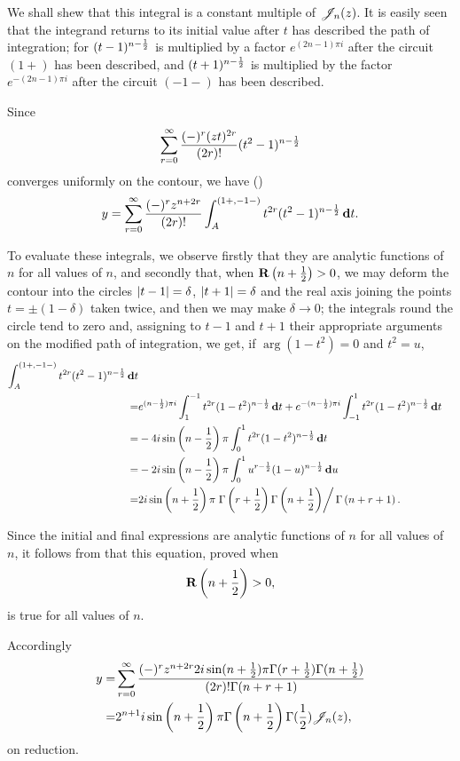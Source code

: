 We shall shew that this integral is a constant multiple of $\mathscr{J}_{n}(z)$.
It is easily seen that the integrand returns to its initial value
after $t$ has described the path of integration; for
$(t-1)^{n-\frac{1}{2}}$ is multiplied by a factor
$e^{(2n-1)\pi i}$ after the circuit $(1+)$ has been described, and
$(t+1)^{n-\frac{1}{2}}$ is multiplied by the factor
$e^{-(2n-1)\pi i}$ after the circuit $(-1-)$ has been described.

Since
$$
\sum_{r=0}^{\infty}
\frac{(-)^{r} (zt)^{2r}}{(2r)!}
(t^{2}-1)^{n-\frac{1}{2}}
$$
converges uniformly on the contour, we have ()
$$
y
=
\sum_{r=0}^{\infty}
\frac{(-)^{r} z^{n+2r}}{(2r)!}
\int_{A}^{(1+,-1-)}
t^{2r}
(t^{2}-1)^{n-\frac{1}{2}}
\, \mathbf{d} t.
$$

To evaluate these integrals, we observe firstly that they are analytic
functions of $n$ for all values of $n$, and secondly that, when
$\operatorname{\mathbf{R}}\left( n+\frac{1}{2} \right) > 0$, we may deform the contour into the
circles $\left| t-1 \right|=\delta$, $\left| t+1 \right|=\delta$ and the real axis
joining the points $t = \pm (1-\delta)$ taken twice, and then we may
make $\delta \rightarrow 0$; the integrals round the circle tend to
zero and, assigning to $t-1$
% 
% 
and $t+1$ their appropriate arguments on the modified path of
integration, we get, if $\arg (1-t^{2}) = 0$ and $t^{2} = u$,
\begin{align*}
  \int_{A}^{(1+,-1-)}
  t^{2r} (t^{2}-1)^{n-\frac{1}{2}} \, \mathbf{d} t
  \\
  =&
  e^{(n-\frac{1}{2}) \pi i}
  \int_{1}^{-1} t^{2r} (1-t^{2})^{n-\frac{1}{2}} \, \mathbf{d} t
  + e^{-(n-\frac{1}{2}) \pi i}
  \int_{-1}^{1} t^{2r} (1-t^{2})^{n-\frac{1}{2}} \, \mathbf{d} t
  \\
  =&
  -4i
  \sin\left( n-\frac{1}{2} \right) 
  \pi
  \int_{0}^{1} t^{2r} (1-t^{2})^{n-\frac{1}{2}} \, \mathbf{d} t
  \\
  =&
  -2i \sin\left( n-\frac{1}{2} \right)
  \pi
  \int_{0}^{1} u^{r-\frac{1}{2}} (1-u)^{n-\frac{1}{2}} \, \mathbf{d} u
  \\
  =&
  2i \sin\left(  n + \frac{1}{2}  \right)
  \pi
  \left.
    \Gamma \left( r + \frac{1}{2} \right)
    \Gamma \left(  n + \frac{1}{2}   \right)
  \right/
  \Gamma \left(  n + r + 1   \right).
\end{align*}

Since the initial and final expressions are analytic functions of $n$
for all values of $n$, it follows from  that this
equation, proved when
$$
\operatorname{\mathbf{R}} \left(  n + \frac{1}{2}  \right) > 0,
$$
is true for all values of $n$.

Accordingly
\begin{align*}
  y
  =&
  \sum_{r=0}^{\infty}
  \frac{(-)^{r} z^{n+2r} 2i \sin(n+\frac{1}{2}) \pi \Gamma(r+\frac{1}{2})
    \Gamma(n+\frac{1}{2})}{ (2r)! \Gamma(n+r+1)}
  \\
  =&
  2^{n+1}
  i
  \sin\left( n+\frac{1}{2} \right)
  \pi
  \Gamma\left( n+\frac{1}{2} \right)
  \Gamma(\frac{1}{2})
  \mathscr{J}_{n}(z),
\end{align*}
on reduction.

